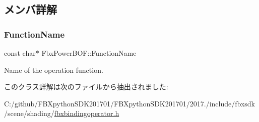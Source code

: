 \subsection{メンバ詳解}
\mbox{\label{class_fbx_power_b_o_f_a1201076a74abe5321aeafafcd4b65f63}} 
\subsubsection{\texorpdfstring{Function\+Name}{FunctionName}}
{\footnotesize\ttfamily const char$\ast$ Fbx\+Power\+B\+O\+F\+::\+Function\+Name\hspace{0.3cm}{\ttfamily [static]}}



Name of the operation function. 



このクラス詳解は次のファイルから抽出されました\+:\begin{DoxyCompactItemize}
\item 
C\+:/github/\+F\+B\+Xpython\+S\+D\+K201701/\+F\+B\+Xpython\+S\+D\+K201701/2017./include/fbxsdk/scene/shading/\hyperlink{fbxbindingoperator_8h}{fbxbindingoperator.\+h}\end{DoxyCompactItemize}
